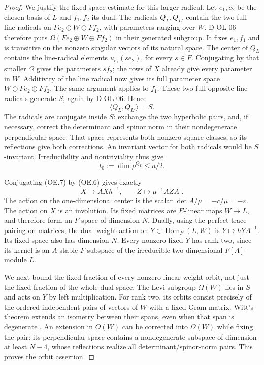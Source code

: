 \begin{proof}
We justify the fixed-space estimate for this larger radical.
Let $e_1,e_2$ be the chosen basis of $L$ and $f_1,f_2$ its dual.
The radicals $Q_L,Q_{L'}$ contain the two full line radicals on
$Fe_2\oplus W\oplus Ff_2$, with parameters ranging over $W$.
D-OL-06 therefore puts
$\Omega(Fe_2\oplus W\oplus Ff_2)$ in their generated subgroup.
It fixes $e_1,f_1$ and is transitive on the nonzero singular
vectors of its natural space.  The center of $Q_L$ contains
the line-radical elements $u_{e_1}(s e_2)$, for every $s\in F$.
Conjugating by that smaller $\Omega$ gives the parameters $s f_2$;
the rows of $X$ already give every parameter in $W$.  Additivity
of the line radical now gives its full parameter space
$W\oplus Fe_2\oplus Ff_2$.  The same argument applies to $f_1$.
These two full opposite line radicals generate $S$, again by
D-OL-06.  Hence
\[
                    \langle Q_L,Q_{L'}\rangle=S.
                    \tag{OE.9}
\]
The radicals are conjugate inside $S$: exchange the two
hyperbolic pairs, and, if necessary, correct the determinant and
spinor norm in their nondegenerate perpendicular space.  That
space represents both nonzero square classes, so its reflections
give both corrections.  An invariant vector for both radicals
would be $S$-invariant.  Irreducibility and nontriviality thus give
\[
                        t_0:=\dim\rho^{Q_L}\le a/2.
                        \tag{OE.10}
\]

Conjugating (OE.7) by (OE.6) gives exactly
\[
             X\longmapsto AXh^{-1},\qquad
             Z\longmapsto\mu^{-1}AZA^{\mathsf t}.
             \tag{OE.11}
\]
The action on the one-dimensional center is the scalar
$\det A/\mu=-c/\mu=-\varepsilon$.
The action on $X$ is an involution.  Its fixed matrices are
$E$-linear maps $W\to L$, and therefore form an $F$-space of
dimension $N$.  Dually, using the perfect trace pairing on
matrices, the dual weight action on $Y\in\operatorname{Hom}_F(L,W)$
is $Y\mapsto hYA^{-1}$.  Its fixed space also has dimension $N$.
Every nonzero fixed $Y$ has rank two, since its kernel is an
$A$-stable $F$-subspace of the irreducible two-dimensional
$F[A]$-module $L$.

We next bound the fixed fraction of every nonzero linear-weight
orbit, not just the fixed fraction of the whole dual space.
The Levi subgroup $\Omega(W)$ lies in $S$ and acts on $Y$ by
left multiplication.  For rank two, its orbits consist precisely
of the ordered independent pairs of vectors of $W$ with a fixed
Gram matrix.  Witt's theorem extends an isometry between their
spans, even when that span is degenerate
\cite[Theorem~7.4 and complete proof, pp.~57--59]{OS:Taylor1992}.
An extension in $O(W)$ can be corrected into $\Omega(W)$ while
fixing the pair: its perpendicular space contains a nondegenerate
subspace of dimension at least $N-4$, whose reflections realize
all determinant/spinor-norm pairs.  This proves the orbit assertion.


\end{proof}
